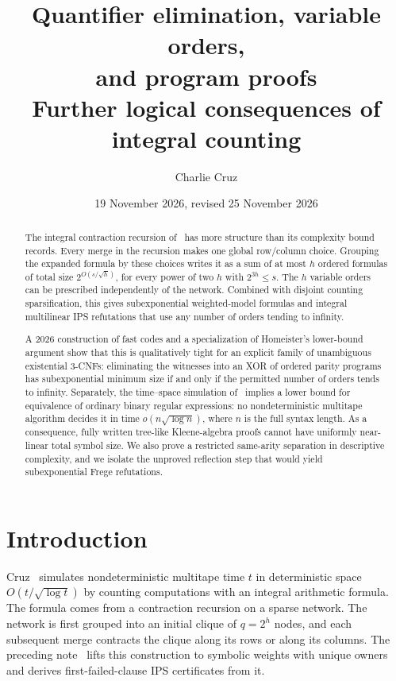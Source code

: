 \documentclass[11pt]{article}
\title{\textbf{Quantifier elimination, variable orders,\protect\\ and program proofs}\\[0.45em]
\large Further logical consequences of integral counting}
\author{Charlie Cruz}
\date{19 November 2026, revised 25 November 2026}
\theoremstyle{definition}
\theoremstyle{remark}
\begin{document}
\maketitle
\begin{abstract}
The integral contraction recursion of~\cite{Cruz26} has more structure
than its complexity bound records. Every merge in the recursion makes
one global row/column choice. Grouping the expanded formula by these
choices writes it as a sum of at most $h$ ordered formulas of total
size $2^{O(s/\sqrt h)}$, for every power of two $h$ with $2^{3h}\le s$.
The $h$ variable orders can be prescribed independently of the network.
Combined with disjoint counting sparsification, this gives
subexponential weighted-model formulas and integral multilinear IPS
refutations that use any number of orders tending to infinity.

A 2026 construction of fast codes and a specialization of Homeister's
lower-bound argument show that this is qualitatively tight for an
explicit family of unambiguous existential 3-CNFs: eliminating the
witnesses into an XOR of ordered parity programs has subexponential
minimum size if and only if the permitted number of orders tends to
infinity. Separately, the time--space simulation of~\cite{Cruz26}
implies a lower bound for equivalence of ordinary binary regular
expressions: no nondeterministic multitape algorithm decides it in
time $o(n\sqrt{\log n})$, where $n$ is the full syntax length. As a
consequence, fully written tree-like Kleene-algebra proofs cannot have
uniformly near-linear total symbol size. We also prove a restricted
same-arity separation in descriptive complexity, and we isolate the
unproved reflection step that would yield subexponential Frege
refutations.
\end{abstract}

\tableofcontents

\section{Introduction}
\label{sec:premises}

Cruz~\cite{Cruz26} simulates nondeterministic multitape time $t$ in
deterministic space $O(t/\sqrt{\log t})$ by counting computations with
an integral arithmetic formula. The formula comes from a contraction
recursion on a sparse network. The network is first grouped into an
initial clique of $q=2^h$ nodes, and each subsequent merge contracts
the clique along its rows or along its columns. The preceding
note~\cite{PreviousNote} lifts this construction to symbolic weights
with unique owners and derives first-failed-clause IPS certificates
from it.
\end{document}
